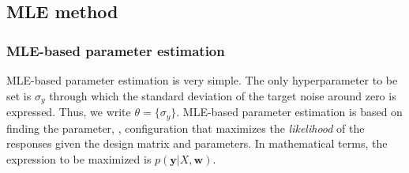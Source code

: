 \subsection{MLE method}

\subsubsection{MLE-based parameter estimation}

MLE-based parameter estimation is very simple. The only hyperparameter to be set is $\sigma_y$ through which the standard deviation of the target noise around zero is expressed. Thus, we write $\theta = \{\sigma_y\}$. MLE-based parameter estimation is based on finding the parameter, , configuration that maximizes the \textit{likelihood} of the responses given the design matrix and parameters. In mathematical terms, the expression to be maximized is $p(\pmb{y}|X,\pmb{w})$.


